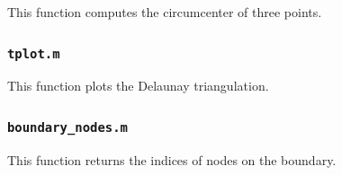 \documentclass[10pt]{article}
\begin{document}
This function computes the circumcenter of three points. 



\subsubsection{{\tt tplot.m}}

This function plots the Delaunay triangulation.



\subsubsection{{\tt boundary\_nodes.m}}

This function returns the indices of nodes on the boundary.


\end{document}
